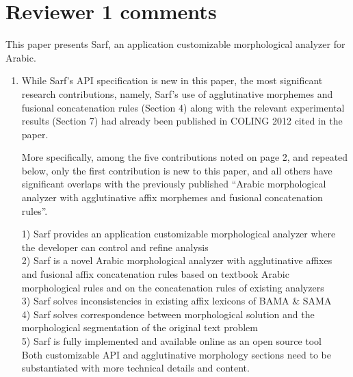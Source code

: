 \section*{Reviewer 1 comments}
This paper presents Sarf, an application customizable morphological analyzer for Arabic. 

\begin{enumerate}[leftmargin=0mm,label=\bfseries CommentR1.\arabic*]
\item \label{Review.1.1}
While Sarf's API specification is new in this paper, the most significant research contributions, namely, Sarf's use of agglutinative morphemes and fusional concatenation rules (Section 4) along with the relevant experimental results (Section 7) had already been published in COLING 2012 cited in the paper.

More specifically, among the five contributions noted on page 2,  and repeated below, only the first contribution is new to this paper, and all others have significant overlaps with the previously published  ``Arabic morphological analyzer with agglutinative affix morphemes and fusional concatenation rules''.

1)      Sarf provides an application customizable morphological analyzer where the developer can control and refine analysis\\
2)      Sarf is a novel Arabic morphological analyzer with agglutinative affixes and fusional affix concatenation rules based on textbook Arabic morphological rules and on the concatenation rules of existing analyzers\\
3)      Sarf solves inconsistencies in existing affix lexicons of BAMA \& SAMA\\
4)      Sarf solves correspondence between morphological solution and the morphological segmentation of the original text problem\\
5)      Sarf is fully implemented and available online as an open source tool\\

Both customizable API and agglutinative morphology sections need to be substantiated with more technical details and content.



\end{enumerate}
